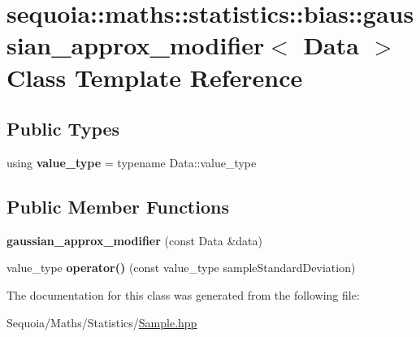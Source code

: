 \hypertarget{classsequoia_1_1maths_1_1statistics_1_1bias_1_1gaussian__approx__modifier}{}\section{sequoia\+::maths\+::statistics\+::bias\+::gaussian\+\_\+approx\+\_\+modifier$<$ Data $>$ Class Template Reference}
\label{classsequoia_1_1maths_1_1statistics_1_1bias_1_1gaussian__approx__modifier}
\subsection*{Public Types}
\begin{DoxyCompactItemize}
\item 
\mbox{\label{classsequoia_1_1maths_1_1statistics_1_1bias_1_1gaussian__approx__modifier_a6511bd4d668c3a957dce4010c7831706}} 
using {\bfseries value\+\_\+type} = typename Data\+::value\+\_\+type
\end{DoxyCompactItemize}
\subsection*{Public Member Functions}
\begin{DoxyCompactItemize}
\item 
\mbox{\label{classsequoia_1_1maths_1_1statistics_1_1bias_1_1gaussian__approx__modifier_a3ef0b0900e579a93d2f91755436f706c}} 
{\bfseries gaussian\+\_\+approx\+\_\+modifier} (const Data \&data)
\item 
\mbox{\label{classsequoia_1_1maths_1_1statistics_1_1bias_1_1gaussian__approx__modifier_ae315d8ec00291c0edb41a5727d6c1c50}} 
value\+\_\+type {\bfseries operator()} (const value\+\_\+type sample\+Standard\+Deviation)
\end{DoxyCompactItemize}


The documentation for this class was generated from the following file\+:\begin{DoxyCompactItemize}
\item 
Sequoia/\+Maths/\+Statistics/\mbox{\hyperlink{_sample_8hpp}{Sample.\+hpp}}\end{DoxyCompactItemize}
